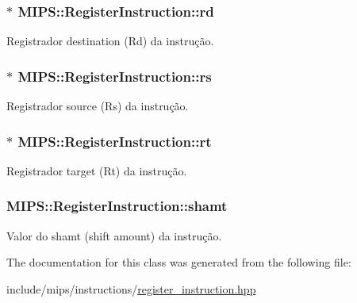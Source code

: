 \subsubsection[{\texorpdfstring{rd}{rd}}]{$\ast$ M\+I\+P\+S\+::\+Register\+Instruction\+::rd\hspace{0.3cm}{\ttfamily [protected]}}\hypertarget{classMIPS_1_1RegisterInstruction_a440089aa8e302ded14fbccfcb6cd5d4f}{}\label{classMIPS_1_1RegisterInstruction_a440089aa8e302ded14fbccfcb6cd5d4f}
Registrador destination (Rd) da instrução. 
\subsubsection[{\texorpdfstring{rs}{rs}}]{$\ast$ M\+I\+P\+S\+::\+Register\+Instruction\+::rs\hspace{0.3cm}{\ttfamily [protected]}}\hypertarget{classMIPS_1_1RegisterInstruction_ac901daa914a523f2725e69ffc1fa6982}{}\label{classMIPS_1_1RegisterInstruction_ac901daa914a523f2725e69ffc1fa6982}
Registrador source (Rs) da instrução. 
\subsubsection[{\texorpdfstring{rt}{rt}}]{$\ast$ M\+I\+P\+S\+::\+Register\+Instruction\+::rt\hspace{0.3cm}{\ttfamily [protected]}}\hypertarget{classMIPS_1_1RegisterInstruction_af6f209ae3da38c3b58c8791837217c07}{}\label{classMIPS_1_1RegisterInstruction_af6f209ae3da38c3b58c8791837217c07}
Registrador target (Rt) da instrução. 
\subsubsection[{\texorpdfstring{shamt}{shamt}}]{ M\+I\+P\+S\+::\+Register\+Instruction\+::shamt\hspace{0.3cm}{\ttfamily [protected]}}\hypertarget{classMIPS_1_1RegisterInstruction_a92e140a46c42d4ece7a1b497f9228fdc}{}\label{classMIPS_1_1RegisterInstruction_a92e140a46c42d4ece7a1b497f9228fdc}
Valor do shamt (shift amount) da instrução. 

The documentation for this class was generated from the following file\+:\begin{DoxyCompactItemize}
\item 
include/mips/instructions/\hyperlink{register__instruction_8hpp}{register\+\_\+instruction.\+hpp}\end{DoxyCompactItemize}
